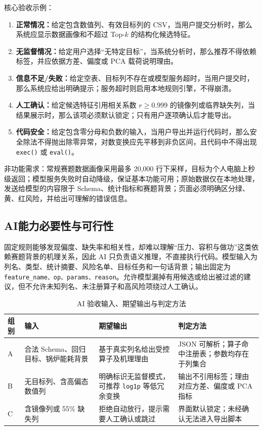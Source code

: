 \documentclass[UTF8,12pt,a4paper]{ctexart}
\begin{document}
核心验收示例：
\begin{enumerate}[leftmargin=2.5em]
  \item \textbf{正常情况：}给定包含数值列、有效目标列的 CSV，当用户提交分析时，那么系统应显示数据画像和不超过 Top-$k$ 的结构化候选特征。
  \item \textbf{无监督情况：}给定用户选择“无特定目标”，当系统分析时，那么推荐不得依赖标签，并应依据方差、偏度或 PCA 载荷说明理由。
  \item \textbf{信息不足/失败：}给定空表、目标列不存在或模型服务超时，当用户提交时，那么系统应给出明确提示；服务超时则启用本地规则引擎，不得崩溃。
  \item \textbf{人工确认：}给定候选特征引用相关系数 $r\geq0.999$ 的镜像列或临界缺失列，当结果展示时，那么该项必须默认锁定；只有用户逐项确认后才能导出。
  \item \textbf{代码安全：}给定包含零分母和负数的输入，当用户导出并运行代码时，那么安全除法不得抛出除零异常，对数变换应先平移到非负区间，且代码中不得出现 \texttt{exec()} 或 \texttt{eval()}。
\end{enumerate}

非功能需求：常规赛题数据画像采用最多 20,000 行下采样，目标为个人电脑上秒级返回；模型服务失败时自动降级，保证基本功能可用；原始数据仅在本地处理，发送给模型的内容限于 Schema、统计指标和赛题背景；页面必须明确区分绿、黄、红风险，并给出可理解的错误信息。

\subsection{AI能力必要性与可行性}

固定规则能够发现偏度、缺失率和相关性，却难以理解“压力、容积与做功”这类依赖赛题背景的机理关系，因此 AI 只负责语义推理，不直接执行代码。模型输入为列名、类型、统计摘要、风险名单、目标任务和一句话背景；输出固定为 \texttt{feature\_name、op、params、reason}。允许模型漏掉有用候选或给出被过滤的建议，但不允许未知列名、未注册算子和高风险项绕过人工确认。

\begin{table}[htbp]
\centering
\caption{AI 验收输入、期望输出与判定方法}\label{tab:aiaccept}
\small
\begin{tabularx}{\textwidth}{p{1.1cm}YYY}
\toprule
组别 & 输入 & 期望输出 & 判定方法 \\
\midrule
A & 合法 Schema、回归目标、锅炉能耗背景 & 基于真实列名给出受控算子及机理理由 & JSON 可解析；算子命中注册表；参数均存在于列集合 \\
B & 无目标列、含高偏态数值列 & 明确标识无监督模式，可推荐 \texttt{log1p} 等低冗余变换 & 输出不引用标签；理由对应方差、偏度或 PCA 指标 \\
C & 含镜像列或 55\% 缺失列 & 拒绝自动放行，提示需要人工确认或跳过 & 界面默认锁定；未经确认无法进入导出脚本 \\
\bottomrule
\end{tabularx}
\end{table}
\end{document}
